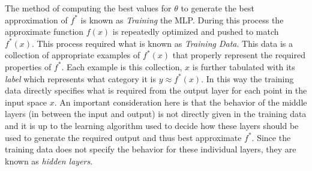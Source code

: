 \documentclass[14pt]{extarticle}
\numberwithin{equation}{section}
\begin{document}
		The method of computing the best values for $\theta$ to generate the best approximation of $f^*$ is known as \textit{Training} the MLP. During this process the approximate function $f(x)$ is repeatedly optimized and pushed to match $f^*(x)$. This process required what is known as \textit{Training Data}. This data is a collection of appropriate examples of $f^*(x)$ that properly represent the required properties of $f^*$. Each example is this collection, $x$ is further tabulated with its \textit{label} which represents what category it is $y \approx f^*(x)$. In this way the training data directly specifies what is required from the output layer for each point in the input space $x$. An important consideration here is that the behavior of the middle layers (in between the input and output) is not directly given in the training data and it is up to the learning algorithm used to decide how these layers should be used to generate the required output and thus best approximate $f^*$. Since the training data does not specify the behavior for these individual layers, they are known as \textit{hidden layers}.
		
\end{document}
